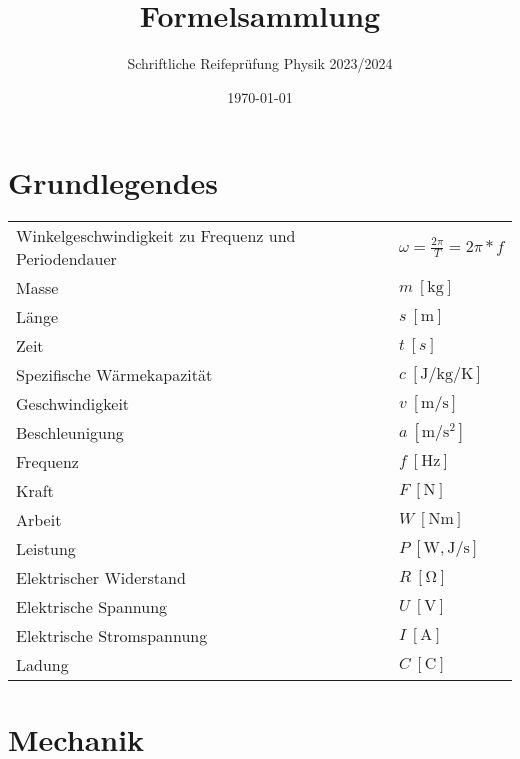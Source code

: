 \documentclass[12pt,a4paper]{paper}
\title{Formelsammlung}
\subtitle{Schriftliche Reifeprüfung Physik 2023/2024}
\author{}
\date{\today}
\makeatletter
\newcommand{\mathleft}{\@fleqntrue\@mathmargin0pt}
\makeatother
\begin{document}
\maketitle
\smalltableofcontents
\mathleft
\section{Grundlegendes}
\begin{tabularx}{\textwidth}{X|X}
	Winkelgeschwindigkeit zu Frequenz und Periodendauer & $\omega = \frac{2\pi}{T}=2\pi*f$ \\
	Masse & $m\: [\unit{\kilo\gram}]$ \\
	Länge & $s\: [\unit{\meter}]$\\
Zeit & $t\:[s]$\\
Spezifische Wärmekapazität & $c\: [\unit{\joule\per\kilo\gram\per\kelvin}]$\\
Geschwindigkeit & $v\:[\unit{\meter\per\second}]$\\
Beschleunigung & $a\:[\unit{\meter\per\second\squared}]$\\
Frequenz & $f\: [\unit{\hertz}]$\\
Kraft & $F\: [\unit{\newton}]$\\
Arbeit & $W \: [\unit{\newton\meter}]$\\
Leistung & $P \: [\unit{\watt},\unit{\joule\per\second}]$\\
Elektrischer Widerstand & $R\:[\unit{\ohm}]$\\
Elektrische Spannung & $U\:[\unit{\volt}]$\\
Elektrische Stromspannung & $I\:[\unit{\ampere}]$\\
Ladung & $C\:[\unit{\coulomb}]$
\end{tabularx}

\section{Mechanik}
\mathleft
\end{document}
